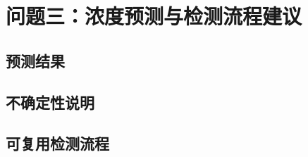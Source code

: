 \section{问题三：浓度预测与检测流程建议}\label{sec:model_q3}
\subsection{预测结果}\label{sec:q3_prediction}
\subsection{不确定性说明}\label{sec:q3_uncertainty}
\subsection{可复用检测流程}\label{sec:q3_pipeline}

